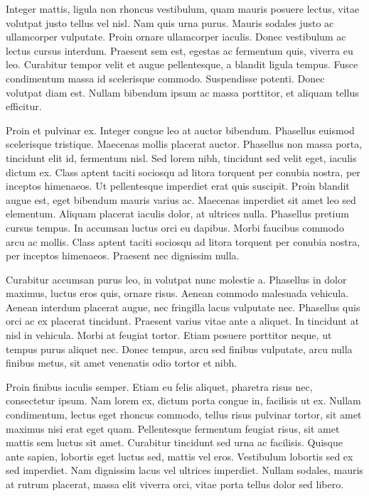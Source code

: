 \documentclass{article}
\begin{document}
Integer mattis, ligula non rhoncus vestibulum, quam mauris posuere lectus, vitae volutpat justo tellus vel nisl. Nam quis urna purus. Mauris sodales justo ac ullamcorper vulputate. Proin ornare ullamcorper iaculis. Donec vestibulum ac lectus cursus interdum. Praesent sem est, egestas ac fermentum quis, viverra eu leo. Curabitur tempor velit et augue pellentesque, a blandit ligula tempus. Fusce condimentum massa id scelerisque commodo. Suspendisse potenti. Donec volutpat diam est. Nullam bibendum ipsum ac massa porttitor, et aliquam tellus efficitur.

Proin et pulvinar ex. Integer congue leo at auctor bibendum. Phasellus euismod scelerisque tristique. Maecenas mollis placerat auctor. Phasellus non massa porta, tincidunt elit id, fermentum nisl. Sed lorem nibh, tincidunt sed velit eget, iaculis dictum ex. Class aptent taciti sociosqu ad litora torquent per conubia nostra, per inceptos himenaeos. Ut pellentesque imperdiet erat quis suscipit. Proin blandit augue est, eget bibendum mauris varius ac. Maecenas imperdiet sit amet leo sed elementum. Aliquam placerat iaculis dolor, at ultrices nulla. Phasellus pretium cursus tempus. In accumsan luctus orci eu dapibus. Morbi faucibus commodo arcu ac mollis. Class aptent taciti sociosqu ad litora torquent per conubia nostra, per inceptos himenaeos. Praesent nec dignissim nulla.

Curabitur accumsan purus leo, in volutpat nunc molestie a. Phasellus in dolor maximus, luctus eros quis, ornare risus. Aenean commodo malesuada vehicula. Aenean interdum placerat augue, nec fringilla lacus vulputate nec. Phasellus quis orci ac ex placerat tincidunt. Praesent varius vitae ante a aliquet. In tincidunt at nisl in vehicula. Morbi at feugiat tortor. Etiam posuere porttitor neque, ut tempus purus aliquet nec. Donec tempus, arcu sed finibus vulputate, arcu nulla finibus metus, sit amet venenatis odio tortor et nibh.

Proin finibus iaculis semper. Etiam eu felis aliquet, pharetra risus nec, consectetur ipsum. Nam lorem ex, dictum porta congue in, facilisis ut ex. Nullam condimentum, lectus eget rhoncus commodo, tellus risus pulvinar tortor, sit amet maximus nisi erat eget quam. Pellentesque fermentum feugiat risus, sit amet mattis sem luctus sit amet. Curabitur tincidunt sed urna ac facilisis. Quisque ante sapien, lobortis eget luctus sed, mattis vel eros. Vestibulum lobortis sed ex sed imperdiet. Nam dignissim lacus vel ultrices imperdiet. Nullam sodales, mauris at rutrum placerat, massa elit viverra orci, vitae porta tellus dolor sed libero.
\end{document}
